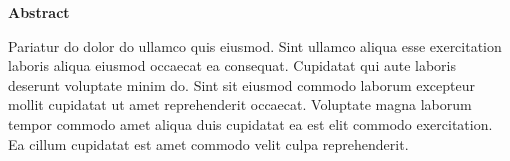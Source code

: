 \thispagestyle{plain}
\begin{center}
    \Large
    \textbf{}
    
    \vspace{0.4cm}
    \large
    

    \vspace{0.4cm}
    \textbf{}

    \vspace{0.9cm}
    \textbf{Abstract}

\end{center}
    Pariatur do dolor do ullamco quis eiusmod. Sint ullamco aliqua esse exercitation laboris aliqua eiusmod occaecat ea consequat. Cupidatat qui aute laboris deserunt voluptate minim do. Sint sit eiusmod commodo laborum excepteur mollit cupidatat ut amet reprehenderit occaecat. Voluptate magna laborum tempor commodo amet aliqua duis cupidatat ea est elit commodo exercitation. Ea cillum cupidatat est amet commodo velit culpa reprehenderit.